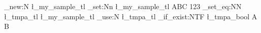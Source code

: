 \documentclass{article}
\begin{document}
\ExplSyntaxOn
\tl_new:N \l_my_sample_tl
\tl_set:Nn \l_my_sample_tl
  { ABC { 123 } }
\tl_set_eq:NN \l_tmpa_tl \l_my_sample_tl
\tl_use:N \l_tmpa_tl
\tl_if_exist:NTF \l_tmpa_bool { A } { B }
\ExplSyntaxOff
\end{document}
